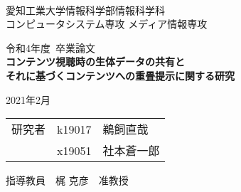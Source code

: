 \begin{titlepage}

\ \\
\begin{center}

{\LARGE 愛知工業大学情報科学部情報科学科\\
コンピュータシステム専攻 メディア情報専攻

\vspace{1.0cm}

令和4年度~卒業論文\\

\vspace{2.0cm}
{\Huge 
\baselineskip=15mm
\textbf{コンテンツ視聴時の生体データの共有と\\それに基づくコンテンツへの重畳提示に関する研究\\}}

\vspace{7.0cm}

2021年2月\\

\vspace{1.0cm}

\begin{tabular}[h]{lll}
  研究者  & k19017 & 鵜飼直哉\\
         & x19051 & 社本蒼一郎\\
\end{tabular}

\vspace{1.0cm}

指導教員\ \ 梶 克彦\ \ 准教授}

\end{center}

\end{titlepage}
    